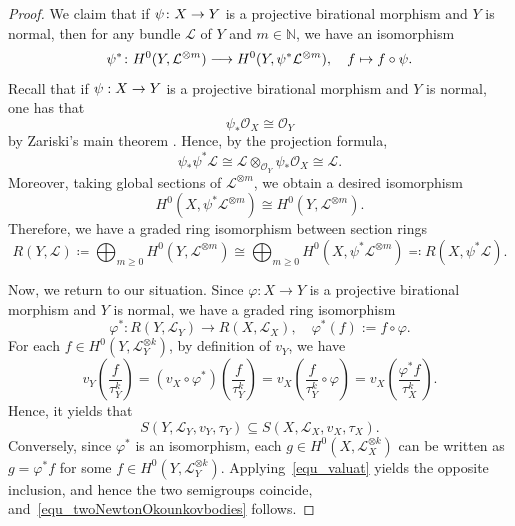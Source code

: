 \documentclass[11pt]{amsart}
\def\mcal{\mathcal}
\numberwithin{equation}{section}
\theoremstyle{plain}
\theoremstyle{definition}
\def\to{\mathchoice{\longrightarrow}{\rightarrow}{\rightarrow}{\rightarrow}}
\numberwithin{equation}{section}
\begin{document}
\begin{proof}
We claim that if $\psi \colon X \to Y$ is a projective birational morphism and $Y$ is normal, then for any bundle $\mathcal{L}$ of $Y$ and $m \in \mathbb{N}$, we have an isomorphism
$$
\psi^* \colon H^0(Y, \mathcal{L}^{\otimes m}) \to H^0(Y, \psi^* \mathcal{L}^{\otimes m}), \quad f \mapsto f \circ \psi.
$$
Recall that if $\psi : X \to Y$ is a projective birational morphism and $Y$ is normal, one has that
\[
    \psi_*\mathcal O_X \cong \mathcal O_Y
\]
by Zariski's main theorem \cite[Corollary III.11.4]{Hartshorne}. Hence, by the projection formula, 
\[
    \psi_*\psi^*{\mcal{L}} \cong {\mcal{L}} \otimes_{\mcal{O}_Y} \psi_*\mathcal O_X \cong {\mcal{L}}.
\]
Moreover, taking global sections of $\mcal{L}^{\otimes m}$, we obtain
a desired isomorphism 
\[
    H^0(X,\psi^*{\mcal{L}}^{\otimes m}) \cong H^0(Y,{\mcal{L}}^{\otimes m}).
\]
Therefore, we have a graded ring isomorphism between section rings
\[
    R(Y,{\mcal{L}}) \coloneqq \bigoplus_{m\ge0} H^0(Y,{\mcal{L}}^{\otimes m}) \cong \bigoplus_{m\ge0} H^0(X,\psi^*{\mcal{L}}^{\otimes m})
    \eqqcolon R(X,\psi^*{\mcal{L}}).
\]

Now, we return to our situation. Since $\varphi \colon X \rightarrow Y$ is a projective birational morphism and $Y$ is normal, we have a graded ring isomorphism
\[
    \varphi^* \colon R(Y,\mcal{L}_Y) \rightarrow R(X,\mcal{L}_X), \quad \varphi^*(f) := f \circ \varphi.
\]
For each $f \in H^0(Y, \mcal{L}_Y^{\otimes k})$, by definition of $v_Y$, we have
\begin{equation}\label{equ_valuat}
v_Y\!\left(\frac{f}{\tau_Y^{k}}\right)
= (v_X \circ \varphi^*)\!\left(\frac{f}{\tau_Y^{k}}\right)
= v_X\!\left(\frac{f}{\tau_Y^{k}} \circ \varphi\right)
= v_X\!\left(\frac{\varphi^*f}{\tau_X^{k}}\right).
\end{equation}
Hence, it yields that
$$
S(Y, \mcal{L}_Y, v_Y, \tau_Y) \subseteq S(X, \mcal{L}_X, v_X, \tau_X).
$$
Conversely, since $\varphi^*$ is an isomorphism, each $g \in H^0(X, \mcal{L}_X^{\otimes k})$ can be written as $g = \varphi^* f$ for some $f \in H^0(Y, \mcal{L}_Y^{\otimes k})$. Applying~\eqref{equ_valuat} yields the opposite inclusion, and hence the two semigroups coincide, and~\eqref{equ_twoNewtonOkounkovbodies} follows.
\end{proof}
\end{document}
